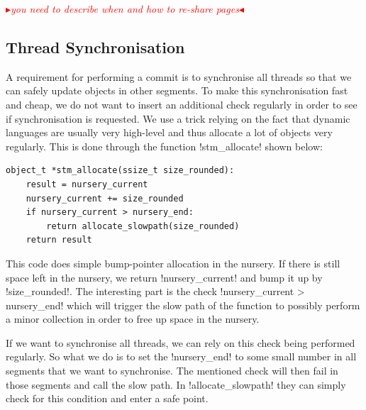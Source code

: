 \documentclass{sigplanconf}
\makeatletter
\renewcommand\lstinline[1][]{%
  \Collectverb{\@@myverb}%
}
\def\@@myverb#1{%
    \begingroup
    \fboxsep=0.2em
    \colorbox{verylightgray}{\oldlstinline|#1|}%
    \endgroup
}
\newcommand{\mynote}[2]{%
  \textcolor{red}{%
    \fbox{\bfseries\sffamily\scriptsize#1}%
    {\small$\blacktriangleright$\textsf{\emph{#2}}$\blacktriangleleft$}%
  }%
}
\newcommand\cfbolz[1]{\mynote{cfbolz}{#1}}
\makeatother
\begin{document}
\cfbolz{you need to describe when and how to re-share pages}


\subsection{Thread Synchronisation}

A requirement for performing a commit is to synchronise all threads so
that we can safely update objects in other segments. To make this
synchronisation fast and cheap, we do not want to insert an additional
check regularly in order to see if synchronisation is requested. We
use a trick relying on the fact that dynamic languages are usually
very high-level and thus allocate a lot of objects very regularly.
This is done through the function \lstinline!stm_allocate!  shown
below:

\begin{lstlisting}
object_t *stm_allocate(ssize_t size_rounded):
    result = nursery_current
	nursery_current += size_rounded
	if nursery_current > nursery_end:
		return allocate_slowpath(size_rounded)
	return result
\end{lstlisting}


This code does simple bump-pointer allocation in the nursery. If there
is still space left in the nursery, we return
\lstinline!nursery_current!  and bump it up by
\lstinline!size_rounded!.  The interesting part is the check
\lstinline!nursery_current > nursery_end!  which will trigger the slow
path of the function to possibly perform a minor collection in order
to free up space in the nursery.

If we want to synchronise all threads, we can rely on this check being
performed regularly. So what we do is to set the
\lstinline!nursery_end!  to some small number in all segments that we
want to synchronise. The mentioned check will then fail in those
segments and call the slow path. In \lstinline!allocate_slowpath!
they can simply check for this condition and enter a safe point.

\end{document}

